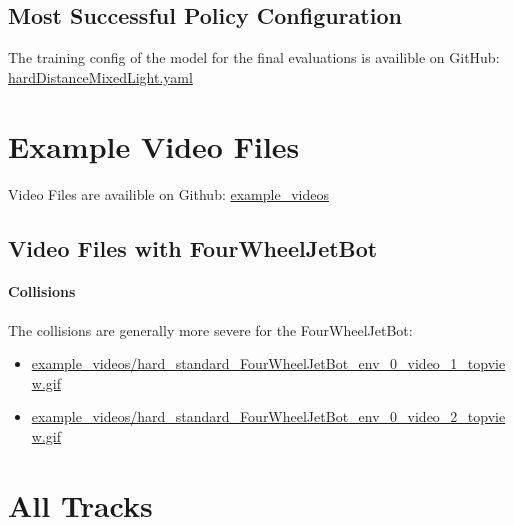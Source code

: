\subsection{Most Successful Policy Configuration}
\label{cha:most_successful_config}

The training config of the model for the final evaluations is availible on GitHub:
\href{https://github.com/geschnee/carsim-rl-cnn/tree/main/python/cfg/hardDistanceMixedLight.yaml}{hardDistanceMixedLight.yaml}

\section{Example Video Files}
\label{cha:example_videos}

Video Files are availible on Github:
\href{https://github.com/geschnee/carsim-rl-cnn/tree/main/python/results/example_videos}{example\_videos}

\subsection{Video Files with FourWheelJetBot}

\paragraph{Collisions}
\label{sec:fourwheel_collisions}

The collisions are generally more severe for the FourWheelJetBot:

\begin{itemize}
    \item \href{https://huggingface.co/geschnee/carsim-rl-cnn/blob/main/example_videos_FourWheelJetbot/hard_standard_FourWheelJetBot_env_0_video_1_topview.gif}{example\_videos/hard\_standard\_FourWheelJetBot\_env\_0\_video\_1\_topview.gif}
    \item \href{https://huggingface.co/geschnee/carsim-rl-cnn/blob/main/example_videos_FourWheelJetbot/hard_standard_FourWheelJetBot_env_0_video_2_topview.gif}{example\_videos/hard\_standard\_FourWheelJetBot\_env\_0\_video\_2\_topview.gif}
\end{itemize}


\section{All Tracks}

